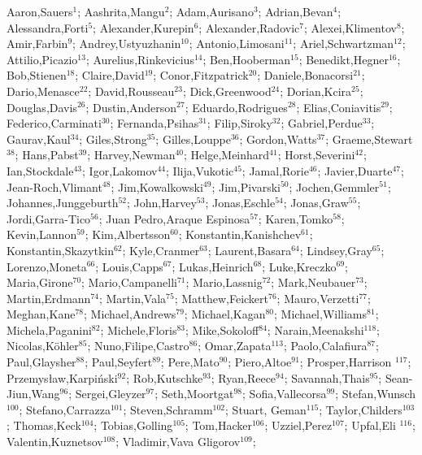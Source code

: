 Aaron,Sauers$^{1}$;
Aashrita,Mangu$^{2}$;
Adam,Aurisano$^{3}$;
Adrian,Bevan$^{4}$;
Alessandra,Forti$^{5}$;
Alexander,Kurepin$^{6}$;
Alexander,Radovic$^{7}$;
Alexei,Klimentov$^{8}$;
Amir,Farbin$^{9}$;
Andrey,Ustyuzhanin$^{10}$;
Antonio,Limosani$^{11}$;
Ariel,Schwartzman$^{12}$;
Attilio,Picazio$^{13}$;
Aurelius,Rinkevicius$^{14}$;
Ben,Hooberman$^{15}$;
Benedikt,Hegner$^{16}$;
Bob,Stienen$^{18}$;
Claire,David$^{19}$;
Conor,Fitzpatrick$^{20}$;
Daniele,Bonacorsi$^{21}$;
Dario,Menasce$^{22}$;
David,Rousseau$^{23}$;
Dick,Greenwood$^{24}$;
Dorian,Kcira$^{25}$;
Douglas,Davis$^{26}$;
Dustin,Anderson$^{27}$;
Eduardo,Rodrigues$^{28}$;
Elias,Coniavitis$^{29}$;
Federico,Carminati$^{30}$;
Fernanda,Psihas$^{31}$;
Filip,Siroky$^{32}$;
Gabriel,Perdue$^{33}$;
Gaurav,Kaul$^{34}$;
Giles,Strong$^{35}$;
Gilles,Louppe$^{36}$;
Gordon,Watts$^{37}$;
Graeme,Stewart$^{38}$;
Hans,Pabst$^{39}$;
Harvey,Newman$^{40}$;
Helge,Meinhard$^{41}$;
Horst,Severini$^{42}$;
Ian,Stockdale$^{43}$;
Igor,Lakomov$^{44}$;
Ilija,Vukotic$^{45}$;
Jamal,Rorie$^{46}$;
Javier,Duarte$^{47}$;
Jean-Roch,Vlimant$^{48}$;
Jim,Kowalkowski$^{49}$;
Jim,Pivarski$^{50}$;
Jochen,Gemmler$^{51}$;
Johannes,Junggeburth$^{52}$;
John,Harvey$^{53}$;
Jonas,Eschle$^{54}$;
Jonas,Graw$^{55}$;
Jordi,Garra-Tico$^{56}$;
Juan Pedro,Araque Espinosa$^{57}$;
Karen,Tomko$^{58}$;
Kevin,Lannon$^{59}$;
Kim,Albertsson$^{60}$;
Konstantin,Kanishchev$^{61}$;
Konstantin,Skazytkin$^{62}$;
Kyle,Cranmer$^{63}$;
Laurent,Basara$^{64}$;
Lindsey,Gray$^{65}$;
Lorenzo,Moneta$^{66}$;
Louis,Capps$^{67}$;
Lukas,Heinrich$^{68}$;
Luke,Kreczko$^{69}$;
Maria,Girone$^{70}$;
Mario,Campanelli$^{71}$;
Mario,Lassnig$^{72}$;
Mark,Neubauer$^{73}$;
Martin,Erdmann$^{74}$;
Martin,Vala$^{75}$;
Matthew,Feickert$^{76}$;
Mauro,Verzetti$^{77}$;
Meghan,Kane$^{78}$;
Michael,Andrews$^{79}$;
Michael,Kagan$^{80}$;
Michael,Williams$^{81}$;
Michela,Paganini$^{82}$;
Michele,Floris$^{83}$;
Mike,Sokoloff$^{84}$;
Narain,Meenakshi$^{118}$;
Nicolas,K{\"o}hler$^{85}$;
Nuno,Filipe,Castro$^{86}$;
Omar,Zapata$^{113}$;
Paolo,Calafiura$^{87}$;
Paul,Glaysher$^{88}$;
Paul,Seyfert$^{89}$;
Pere,Mato$^{90}$;
Piero,Altoe$^{91}$;
Prosper,Harrison $^{117}$;
Przemysław,Karpiński$^{92}$;
Rob,Kutschke$^{93}$;
Ryan,Reece$^{94}$;
Savannah,Thais$^{95}$;
Sean-Jiun,Wang$^{96}$;
Sergei,Gleyzer$^{97}$;
Seth,Moortgat$^{98}$;
Sofia,Vallecorsa$^{99}$;
Stefan,Wunsch$^{100}$;
Stefano,Carrazza$^{101}$;
Steven,Schramm$^{102}$;
Stuart, Geman$^{115}$;
Taylor,Childers$^{103}$;
Thomas,Keck$^{104}$;
Tobias,Golling$^{105}$;
Tom,Hacker$^{106}$;
Uzziel,Perez$^{107}$;
Upfal,Eli $^{116}$;
Valentin,Kuznetsov$^{108}$;
Vladimir,Vava Gligorov$^{109}$;
